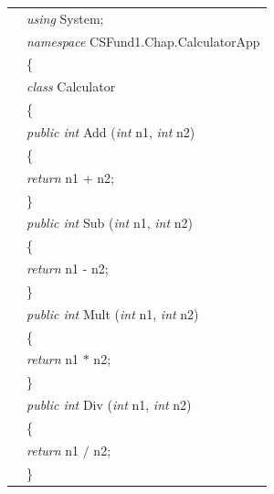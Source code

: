 \renewcommand{\baselinestretch}{0.8}
\begin{program}
\begin{tabular}{>{\codelinenumfont}l>{\codelistingfont}l}

1 & \emph{using} System; \\
2 & \emph{namespace} CSFund1.Chap\thechapter.CalculatorApp \\
3 & \{ \\
4 &  \hspace{0.2in} \emph{class} Calculator  \\
5 &  \hspace{0.2in} \{  \\
6 &  \hspace{0.4in} \emph{public int} Add (\emph{int} n1, \emph{int} n2) \\
7 &  \hspace{0.4in} \{ \\
8 &  \hspace{0.6in} \emph{return} n1 + n2; \\
9 &  \hspace{0.4in} \} \\
10 &  \hspace{0.4in} \emph{public int} Sub (\emph{int} n1, \emph{int} n2) \\
11 &  \hspace{0.4in} \{ \\
12 &  \hspace{0.6in} \emph{return} n1 - n2; \\
13 &  \hspace{0.4in} \} \\
14 &  \hspace{0.4in} \emph{public int} Mult (\emph{int} n1, \emph{int} n2) \\
15 &  \hspace{0.4in} \{ \\
16 &  \hspace{0.6in} \emph{return} n1 $\ast$ n2; \\
17 &  \hspace{0.4in} \} \\
18 &  \hspace{0.4in} \emph{public int} Div (\emph{int} n1, \emph{int} n2) \\
19 &  \hspace{0.4in} \{ \\
20 &  \hspace{0.6in} \emph{return} n1 $/$ n2;  \\
21 &  \hspace{0.4in} \} \\

\end{tabular}
\end{program}
